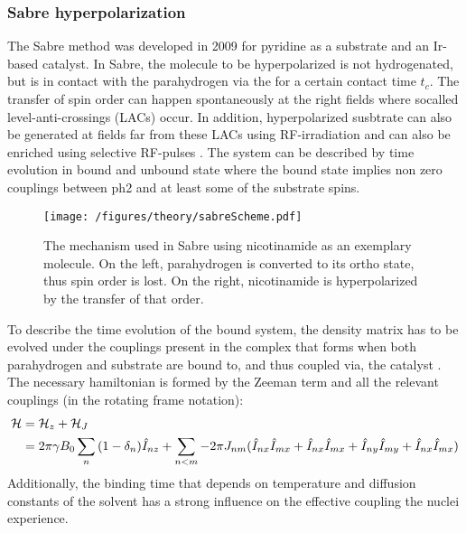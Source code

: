         \subsubsection{Sabre hyperpolarization}
        \label{HPSabre}
            The Sabre method was developed in 2009 \cite{adams_reversible_2009-2} for pyridine as a substrate and an Ir-based catalyst.
            In Sabre, the molecule to be hyperpolarized is not hydrogenated, but is in contact with the parahydrogen via the for a certain contact time $t_c$. The transfer of spin order can happen spontaneously at the right fields \cite{atkinson_spontaneous_2009-1} where socalled level-anti-crossings (LACs) occur. In addition, hyperpolarized susbtrate can also be generated at fields far from these LACs using RF-irradiation \cite{pravdivtsev_spin_2014, knecht_quantitative_2019} and can also be enriched using selective RF-pulses \cite{knecht_re-polarization_2018-1}. The system can be described by time evolution in bound and unbound state where the bound state implies non zero couplings between ph2 and at least some of the substrate spins.
            \begin{figure}
                \centering
                \texttt{[image: /figures/theory/sabreScheme.pdf]}
                \caption[Sabre scheme]{The mechanism used in Sabre using nicotinamide as an exemplary molecule. On the left, parahydrogen is converted to its ortho state, thus spin order is lost. On the right, nicotinamide is hyperpolarized by the transfer of that order.}
            \end{figure}
            To describe the time evolution of the bound system, the density matrix has to be evolved under the couplings present in the complex that forms when both parahydrogen and substrate are bound to, and thus coupled via, the catalyst \cite{}. The necessary hamiltonian is formed by the Zeeman term and all the relevant couplings (in the rotating frame notation):
            \begin{equation}
                \begin{aligned}
                    \mathcal{H}& = \mathcal{H}_z + \mathcal{H}_J \\
                        & =\-2\pi\gamma B_0 \sum_n{(1-\delta_n)\hat{I}_{nz}} + \sum_{n<m} -2\pi J_{nm}(\hat{I}_{nx}\hat{I}_{mx} + \hat{I}_{nx}\hat{I}_{mx}+ \hat{I}_{ny}\hat{I}_{my} + \hat{I}_{nx}\hat{I}_{mx})
                \end{aligned}
            \end{equation}
            Additionally, the binding time that depends on temperature and diffusion constants of the solvent has a strong influence on the effective coupling the nuclei experience.
